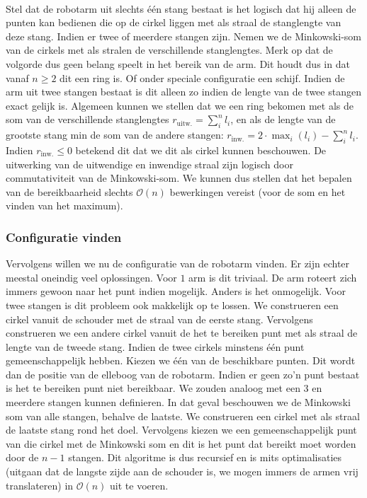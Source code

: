 \documentclass[a4paper,titlepage]{article}
\newcommand{\termen}[1]{\index{#1}\textbf{\sffamily{#1}}}
\newcommand{\brak}[1]{\left(#1\right)}
\newcommand{\bigoh}[1]{\ensuremath{\mathcal{O}\left(#1\right)}}
\begin{document}
\paragraph{}
Stel dat de robotarm uit slechts \'e\'en stang bestaat is het logisch dat hij alleen de punten kan bedienen die op de cirkel liggen met als straal de stanglengte van deze stang. Indien er twee of meerdere stangen zijn. Nemen we de Minkowski-som van de cirkels met als stralen de verschillende stanglengtes. Merk op dat de volgorde dus geen belang speelt in het bereik van de arm. Dit houdt dus in dat vanaf $n\geq2$ dit een ring is. Of onder speciale configuratie een schijf. Indien de arm uit twee stangen bestaat is dit alleen zo indien de lengte van de twee stangen exact gelijk is. Algemeen kunnen we stellen dat we een ring bekomen met als \termen{buitenstraal} de som van de verschillende stanglengtes $r_{\mbox{uitw.}}=\sum_i^nl_i$, en als \termen{binnenstraal} de lengte van de grootste stang min de som van de andere stangen: $r_{\mbox{inw.}}=2\cdot\max_i\brak{l_i}-\sum_i^nl_i$. Indien $r_{\mbox{inw.}}\leq0$ betekend dit dat we dit als cirkel kunnen beschouwen. De uitwerking van de uitwendige en inwendige straal zijn logisch door commutativiteit van de Minkowski-som. We kunnen dus stellen dat het bepalen van de bereikbaarheid slechts \bigoh{n} bewerkingen vereist (voor de som en het vinden van het maximum).
\subsubsection{Configuratie vinden}
Vervolgens willen we nu de configuratie van de robotarm vinden. Er zijn echter meestal oneindig veel oplossingen. Voor $1$ arm is dit triviaal. De arm roteert zich immers gewoon naar het punt indien mogelijk. Anders is het onmogelijk. Voor twee stangen is dit probleem ook makkelijk op te lossen. We construeren een cirkel vanuit de schouder met de straal van de eerste stang. Vervolgens construeren we een andere cirkel vanuit de het te bereiken punt met als straal de lengte van de tweede stang. Indien de twee cirkels minstens \'e\'en punt gemeenschappelijk hebben. Kiezen we \'e\'en van de beschikbare punten. Dit wordt dan de positie van de elleboog van de robotarm. Indien er geen zo'n punt bestaat is het te bereiken punt niet bereikbaar. We zouden analoog met een 3 en meerdere stangen kunnen definieren. In dat geval beschouwen we de Minkowski som van alle stangen, behalve de laatste. We construeren een cirkel met als straal de laatste stang rond het doel. Vervolgens kiezen we een gemeenschappelijk punt van die cirkel met de Minkowski som en dit is het punt dat bereikt moet worden door de $n-1$ stangen. Dit algoritme is dus recursief en is mits optimalisaties (uitgaan dat de langste zijde aan de schouder is, we mogen immers de armen vrij translateren) in \bigoh{n} uit te voeren.
\end{document}
